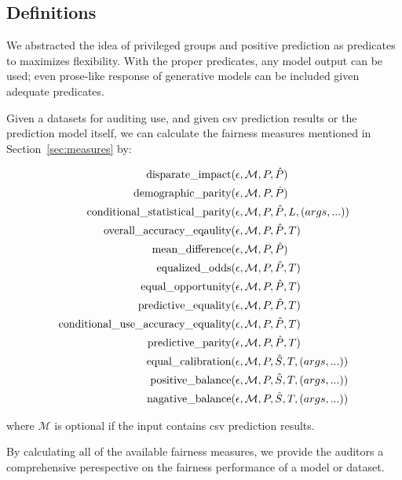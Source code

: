 \documentclass[conference]{IEEEtran}
\begin{document}
\subsection{Definitions}
We abstracted the idea of privileged groups and positive prediction as predicates to maximizes flexibility. With the proper predicates, any model output can be used; even prose-like response of generative models can be included given adequate predicates.

Given a datasets for auditing use, and given csv prediction results or the prediction model itself, we can calculate the fairness measures mentioned in Section~\ref{sec:measures} by:

\begin{align*}
\text{disparate\_impact} & (\epsilon, \mathcal{M}, P, \hat{P}) \\
\text{demographic\_parity} & (\epsilon, \mathcal{M}, P, \hat{P}) \\
\text{conditional\_statistical\_parity} & (\epsilon, \mathcal{M}, P, \hat{P}, L, (args, ...)) \\
\text{overall\_accuracy\_eqaulity} & (\epsilon, \mathcal{M}, P, \hat{P}, T) \\
\text{mean\_difference} & (\epsilon, \mathcal{M}, P, \hat{P}) \\
\text{equalized\_odds} & (\epsilon, \mathcal{M}, P, \hat{P}, T) \\
\text{equal\_opportunity} & (\epsilon, \mathcal{M}, P, \hat{P}, T) \\
\text{predictive\_equality} & (\epsilon, \mathcal{M}, P, \hat{P}, T) \\
\text{conditional\_use\_accuracy\_equality} & (\epsilon, \mathcal{M}, P, \hat{P}, T) \\
\text{predictive\_parity} & (\epsilon, \mathcal{M}, P, \hat{P}, T) \\
\text{equal\_calibration} & (\epsilon, \mathcal{M}, P, \hat{S}, T, (args, ...)) \\
\text{positive\_balance} & (\epsilon, \mathcal{M}, P, \hat{S}, T, (args, ...)) \\
\text{nagative\_balance} & (\epsilon, \mathcal{M}, P, \hat{S}, T, (args, ...)) \\
\end{align*}

where $\mathcal{M}$ is optional if the input contains csv prediction results.

By calculating all of the available fairness measures, we provide the auditors a comprehensive perespective on the fairness performance of a model or dataset.
\end{document}
